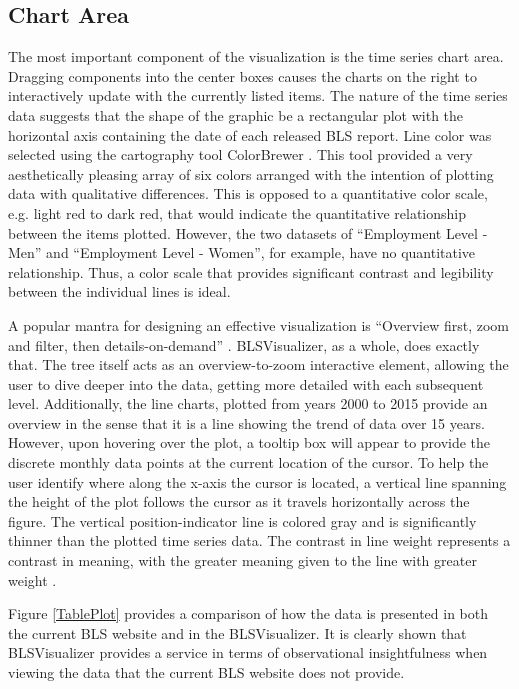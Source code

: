 \documentclass{sigchi}
\begin{document}
\subsection{Chart Area}

The most important component of the visualization is the time series chart area. Dragging components into the center boxes causes the charts on the right to interactively update with the currently listed items. The nature of the time series data suggests that the shape of the graphic be a rectangular plot with the horizontal axis containing the date of each released BLS report. Line color was selected using the cartography tool ColorBrewer \cite{harrower2003colorbrewer}. This tool provided a very aesthetically pleasing array of six colors arranged with the intention of plotting data with qualitative differences. This is opposed to a quantitative color scale, e.g. light red to dark red, that would indicate the quantitative relationship between the items plotted. However, the two datasets of ``Employment Level - Men'' and ``Employment Level - Women'', for example, have no quantitative relationship. Thus, a color scale that provides significant contrast and legibility between the individual lines is ideal.

A popular mantra for designing an effective visualization is ``Overview first, zoom and filter, then details-on-demand'' \cite{shneiderman_eyes_1996}. BLSVisualizer, as a whole, does exactly that. The tree itself acts as an overview-to-zoom interactive element, allowing the user to dive deeper into the data, getting more detailed with each subsequent level. Additionally, the line charts, plotted from years 2000 to 2015 provide an overview in the sense that it is a line showing the trend of data over 15 years. However, upon hovering over the plot, a tooltip box will appear to provide the discrete monthly data points at the current location of the cursor. To help the user identify where along the x-axis the cursor is located, a vertical line spanning the height of the plot follows the cursor as it travels horizontally across the figure. The vertical position-indicator line is colored gray and is significantly thinner than the plotted time series data. The contrast in line weight represents a contrast in meaning, with the greater meaning given to the line with greater weight \cite{tufte1983visual}.

Figure \ref{TablePlot} provides a comparison of how the data is presented in both the current BLS website and in the BLSVisualizer. It is clearly shown that BLSVisualizer provides a service in terms of observational insightfulness when viewing the data that the current BLS website does not provide.
\end{document}
